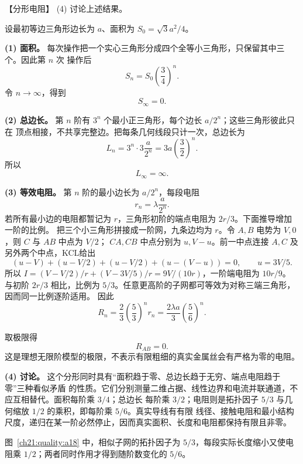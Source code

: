 {\begin{origexamplebox}{【分形电阻】}
(4) 讨论上述结果。
\par\noindent\begin{minipage}{\linewidth}
\sierpinskiProblemFigure
{}
\end{minipage}\par\medskip
\end{origexamplebox}\par\nopagebreak[4]


\begin{xesolution}
设最初等边三角形边长为 $a$、面积为 $S_0=\sqrt3a^2/4$。

\textbf{(1) 面积。} 每次操作把一个实心三角形分成四个全等小三角形，只保留其中三个。因此第 $n$ 次
操作后
\[
  S_n=S_0\left(\frac34\right)^n.
\]
令 $n\to\infty$，得到
\[
  \boxed{S_\infty=0}.
\]

\textbf{(2) 总边长。} 第 $n$ 阶有 $3^n$ 个最小正三角形，每个边长 $a/2^n$；这些三角形彼此只在
顶点相接，不共享完整边。把每条几何线段只计一次，总边长为
\[
  L_n=3^n\cdot3\frac{a}{2^n}
  =3a\left(\frac32\right)^n.
\]
所以
\[
  \boxed{L_\infty=\infty}.
\]

\textbf{(3) 等效电阻。} 第 $n$ 阶的最小边长为 $a/2^n$，每段电阻
\[
  r_n=\lambda\frac{a}{2^n}.
\]
若所有最小边的电阻都暂记为 $r$，三角形初阶的端点电阻为 $2r/3$。下面推导增加一阶的比例。
把三个小三角形拼接成一阶网，九条边均为 $r$。令 $A,B$ 电势为 $V,0$，则 $C$ 与 $AB$ 中点为 $V/2$；
$CA,CB$ 中点分别为 $u,V-u$。前一中点连接 $A,C$ 及另外两个中点，KCL给出
\[
 (u-V)+(u-V/2)+(u-V/2)+(u-(V-u))=0,
 \qquad u=3V/5.
\]
所以 $I=(V-V/2)/r+(V-3V/5)/r=9V/(10r)$，一阶端电阻为 $10r/9$。
与初阶 $2r/3$ 相比，比例为 $5/3$。任意更高阶的子网都可等效为对称三端三角形，因而同一比例逐阶适用。
因此
\[
  R_n=\frac23\left(\frac53\right)^n r_n
  =\frac{2\lambda a}{3}\left(\frac56\right)^n.
\]

\par\noindent\begin{minipage}{\linewidth}
\sierpinskiResistanceFigure
{}
\end{minipage}\par\medskip

取极限得
\[
  \boxed{R_{AB}=0}.
\]
这是理想无限阶模型的极限，不表示有限粗细的真实金属丝会有严格为零的电阻。

\textbf{(4) 讨论。} 这个分形同时具有“面积趋于零、总边长趋于无穷、端点电阻趋于零”三种看似矛盾
的性质。它们分别测量二维占据、线性边界和电流并联通道，不应互相替代。面积每阶乘 $3/4$；总边长
每阶乘 $3/2$；电阻则是拓扑因子 $5/3$ 与几何缩放 $1/2$ 的乘积，即每阶乘 $5/6$。真实导线有有限
线径、接触电阻和最小结构尺度，递归在某一阶必然停止，因而真实面积、长度和电阻都保持有限且非零。

图~\ref{ch21:quality:a18} 中，相似子网的拓扑因子为 $5/3$，每段实际长度缩小又使电阻乘 $1/2$；两者同时作用才得到随阶数变化的 $5/6$。
\end{xesolution}
}

\endgroup


\begingroup{}

\endgroup
\endgroup
